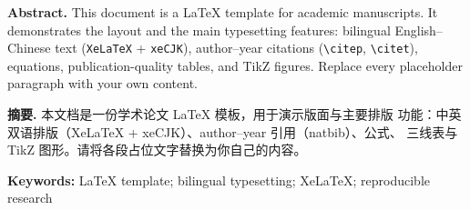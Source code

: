 
\textbf{Abstract.} This document is a LaTeX template for academic
manuscripts. It demonstrates the layout and the main typesetting features:
bilingual English--Chinese text (\texttt{XeLaTeX} + \texttt{xeCJK}),
author--year citations (\texttt{\textbackslash citep}, \texttt{\textbackslash citet}),
equations, publication-quality tables, and TikZ figures. Replace every
placeholder paragraph with your own content.

\textbf{摘要.} 本文档是一份学术论文 LaTeX 模板，用于演示版面与主要排版
功能：中英双语排版（XeLaTeX + xeCJK）、author–year 引用（natbib）、公式、
三线表与 TikZ 图形。请将各段占位文字替换为你自己的内容。

\medskip
\textbf{Keywords:} LaTeX template; bilingual typesetting; XeLaTeX;
reproducible research
